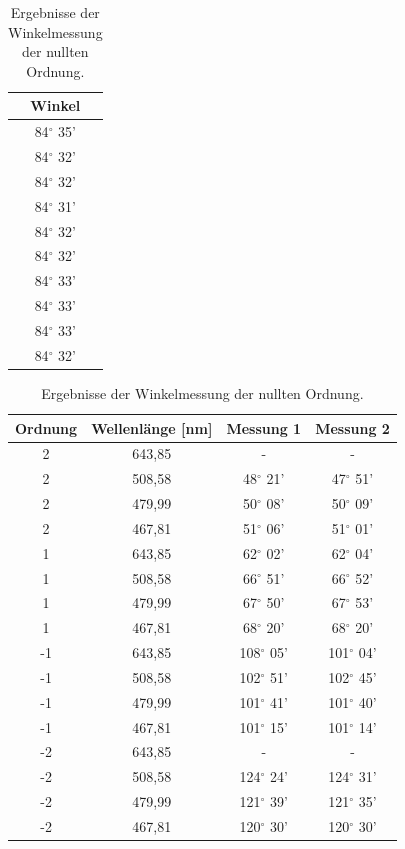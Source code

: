 \documentclass[12pt,a4paper]{article}
\begin{document}
\begin{table}
\begin{center}
\begin{tabular}{|c|}
\hline
Winkel \\
\hline
84$^{\circ}$ 35'\\
\hline
84$^{\circ}$ 32'\\
\hline
84$^{\circ}$ 32'\\
\hline
84$^{\circ}$ 31'\\
\hline
84$^{\circ}$ 32'\\
\hline
84$^{\circ}$ 32'\\
\hline
84$^{\circ}$ 33'\\
\hline
84$^{\circ}$ 33'\\
\hline
84$^{\circ}$ 33'\\
\hline
84$^{\circ}$ 32'\\
\hline
\end{tabular}
\caption{Ergebnisse der Winkelmessung der nullten Ordnung.}
\label{tab:RohdatenRauschmessungGitter}
\end{center}
\end{table}

\begin{table}
\begin{center}
\begin{tabular}{|c|c|c|c|}
\hline
Ordnung & Wellenlänge [nm] & Messung 1 & Messung 2\\
\hline
2 & 643,85 & - & -\\
\hline
2 & 508,58 & 48$^{\circ}$ 21' & 47$^{\circ}$ 51'\\
\hline
2 & 479,99 & 50$^{\circ}$ 08' & 50$^{\circ}$ 09'\\
\hline
2 & 467,81 & 51$^{\circ}$ 06' & 51$^{\circ}$ 01'\\
\hline
1 & 643,85 & 62$^{\circ}$ 02' & 62$^{\circ}$ 04'\\
\hline
1 & 508,58 & 66$^{\circ}$ 51' & 66$^{\circ}$ 52'\\
\hline
1 & 479,99 & 67$^{\circ}$ 50' & 67$^{\circ}$ 53'\\
\hline
1 & 467,81 & 68$^{\circ}$ 20' & 68$^{\circ}$ 20'\\
\hline
-1 & 643,85 & 108$^{\circ}$ 05' & 101$^{\circ}$ 04'\\
\hline
-1 & 508,58 & 102$^{\circ}$ 51' & 102$^{\circ}$ 45'\\
\hline
-1 & 479,99 & 101$^{\circ}$ 41' & 101$^{\circ}$ 40'\\
\hline
-1 & 467,81 & 101$^{\circ}$ 15' & 101$^{\circ}$ 14'\\
\hline
-2 & 643,85 & - & -\\
\hline
-2 & 508,58 & 124$^{\circ}$ 24' & 124$^{\circ}$ 31'\\
\hline
-2 & 479,99 & 121$^{\circ}$ 39' & 121$^{\circ}$ 35'\\
\hline
-2 & 467,81 & 120$^{\circ}$ 30' & 120$^{\circ}$ 30'\\
\hline
\end{tabular}
\caption{Ergebnisse der Winkelmessung der nullten Ordnung.}
\label{tab:RohdatenBestimmungGitterkonstante}
\end{center}
\end{table}
\end{document}
